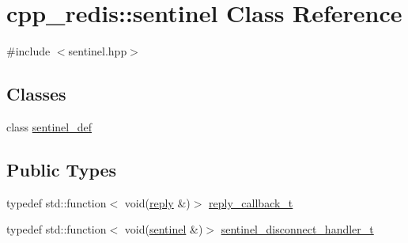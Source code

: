 \hypertarget{classcpp__redis_1_1sentinel}{}\section{cpp\+\_\+redis\+:\+:sentinel Class Reference}
\label{classcpp__redis_1_1sentinel}


{\ttfamily \#include $<$sentinel.\+hpp$>$}

\subsection*{Classes}
\begin{DoxyCompactItemize}
\item 
class \hyperlink{classcpp__redis_1_1sentinel_1_1sentinel__def}{sentinel\+\_\+def}
\end{DoxyCompactItemize}
\subsection*{Public Types}
\begin{DoxyCompactItemize}
\item 
typedef std\+::function$<$ void(\hyperlink{classcpp__redis_1_1reply}{reply} \&)$>$ \hyperlink{classcpp__redis_1_1sentinel_ae1a150ff8787208c47414397a061c9a7}{reply\+\_\+callback\+\_\+t}
\item 
typedef std\+::function$<$ void(\hyperlink{classcpp__redis_1_1sentinel}{sentinel} \&)$>$ \hyperlink{classcpp__redis_1_1sentinel_a923e06b5b700c16dffec8a01d2fa9aa4}{sentinel\+\_\+disconnect\+\_\+handler\+\_\+t}
\end{DoxyCompactItemize}
